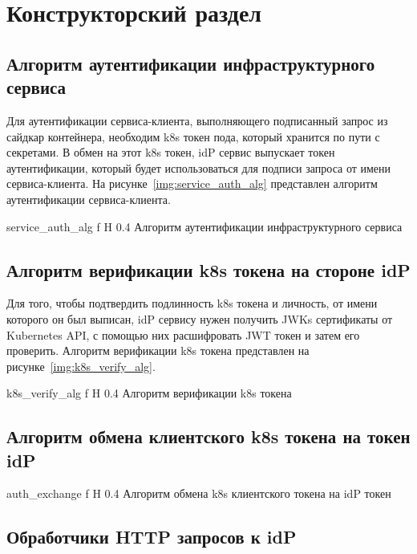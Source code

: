 \chapter{Конструкторский раздел}

\section{Алгоритм аутентификации инфраструктурного сервиса}
Для аутентификации сервиса-клиента, выполняющего подписанный запрос из сайдкар контейнера, необходим k8s токен пода, который хранится по пути с секретами. В обмен на этот k8s токен, idP сервис выпускает токен аутентификации, который будет использоваться для подписи запроса от имени сервиса-клиента. На рисунке~\ref{img:service_auth_alg} представлен алгоритм аутентификации сервиса-клиента.

    {service_auth_alg}
    {f}
    {H}
    {0.4\textwidth}
    {Алгоритм аутентификации инфраструктурного сервиса}


\section{Алгоритм верификации k8s токена на стороне idP}
Для того, чтобы подтвердить подлинность k8s токена и личность, от имени которого он был выписан, idP сервису нужен получить JWKs сертификаты от Kubernetes API, с помощью них расшифровать JWT токен и затем его проверить. Алгоритм верификации k8s токена представлен на рисунке~\ref{img:k8s_verify_alg}.

    {k8s_verify_alg}
    {f}
    {H}
    {0.4\textwidth}
    {Алгоритм верификации k8s токена}
    

\section{Алгоритм обмена клиентского k8s токена на токен idP}

    {auth_exchange}
    {f}
    {H}
    {0.4\textwidth}
    {Алгоритм обмена k8s клиентского токена на idP токен}


\section{Обработчики HTTP запросов к idP}

